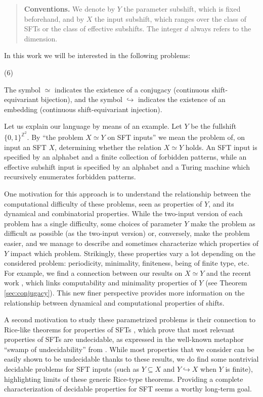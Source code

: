 \documentclass[a4paper]{article}
\newcommand{\Z}{\mathbb{Z}}
\theoremstyle{definition}
\begin{document}
\begin{quote}
    \textbf{Conventions.} We denote by $Y$ the parameter subshift, which is fixed beforehand, and by $X$ the input subshift, which ranges over the class of SFTs or the class of effective subshifts. The integer $d$ always refers to the dimension. 
\end{quote}
In this work we will be interested in the following problems:
\begin{tasks}[style=itemize](6)
\end{tasks}
The symbol $\simeq$ indicates the existence of a conjugacy (continuous shift-equivariant bijection), and the symbol $\hookrightarrow$ indicates the existence of an embedding (continuous shift-equivariant injection). 

Let us explain our language by means of an example. Let $Y$ be the fullshift $\{0,1\}^{\Z^2}$. By ``the problem $X\simeq Y$ on SFT inputs'' we mean the problem of, on input an SFT $X$, determining whether the relation $X\simeq Y$ holds. An SFT input is specified by an alphabet and a finite collection of forbidden patterns, while an effective subshift input is specified by an alphabet and a Turing machine which recursively enumerates forbidden patterns.    
 
One motivation for this approach is to understand the relationship between the computational difficulty of these problems, seen as properties of $Y$, and its dynamical and combinatorial properties. While the two-input version of each problem has a single difficulty, 
some choices of parameter $Y$ make the problem as difficult as possible (as the two-input version) or, conversely, make the problem easier, and we manage to describe and sometimes characterize which properties of $Y$ impact which problem. Strikingly, these properties vary a lot depending on the considered problem: periodicity, minimality, finiteness, being of finite type, etc. For example, we find a connection between our results on $X\simeq Y$ and the recent work \cite{amir_minimality_2025}, which links computability and minimality properties of $Y$ (see Theorem \ref{sec:conjugacy}). This new finer perspective provides more information on the relationship between dynamical and computational properties of shifts.

A second motivation to study these parametrized problems is their connection to Rice-like theorems for properties of SFTs \cite{cervelle_tilings_2004,delvenne_quasi-periodic_2004,lafitte_computability_2008,carrasco-vargas_rice_2025}, which prove that most relevant properties of SFTs are undecidable, as expressed in the well-known metaphor ``swamp of undecidability'' from \cite{lind_multi-dimensional_2004}. While most properties that we consider can be easily shown to be undecidable thanks to these results, we do find some nontrivial decidable problems for SFT inputs (such as $Y\subseteq X$ and $Y\hookrightarrow X$ when $Y$ is finite), highlighting limits of these generic Rice-type theorems. Providing a complete characterization of decidable properties for SFT seems a worthy long-term goal.
\end{document}
